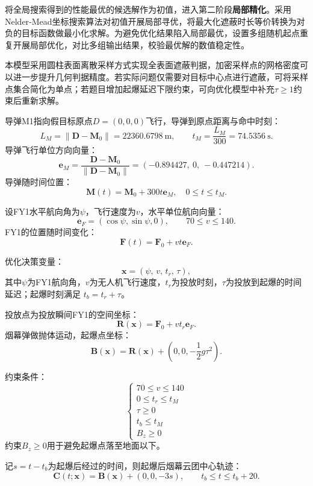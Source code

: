 \documentclass[12pt,a4paper]{article}
\begin{document}
	将全局搜索得到的性能最优的候选解作为初值，进入第二阶段\textbf{局部精化}。采用Nelder‑Mead坐标搜索算法对初值开展局部寻优，将最大化遮蔽时长等价转换为对负的目标函数做最小化求解。为避免优化结果陷入局部最优，设置多组随机起点重复开展局部优化，对比多组输出结果，校验最优解的数值稳定性。
	

	
	本模型采用圆柱表面离散采样方式实现全表面遮蔽判据，加密采样点的网格密度可以进一步提升几何判据精度。若实际问题仅需要对目标中心点进行遮蔽，可将采样点集合简化为单点；若题目增加起爆延迟下限约束，可向优化模型中补充$\tau\ge1$约束后重新求解。


	
	
	导弹M1指向假目标原点$D=(0,0,0)$飞行，导弹到原点距离与命中时刻：
	\[
	L_M=\|\boldsymbol D-\boldsymbol M_0\|=22360.6798\ \mathrm{m},\qquad t_M=\frac{L_M}{300}=74.5356\ \mathrm{s}.
	\]
	导弹飞行单位方向向量：
	\[
	\boldsymbol e_M=\frac{\boldsymbol D-\boldsymbol M_0}{\|\boldsymbol D-\boldsymbol M_0\|}=(-0.894427,\ 0,\ -0.447214).
	\]
	导弹随时间位置：
	\[
	\boldsymbol M(t)=\boldsymbol M_0+300t\boldsymbol e_M,\quad 0\le t\le t_M.
	\]
	
	设FY1水平航向角为$\psi$，飞行速度为$v$，水平单位航向向量：
	\[
	\boldsymbol e_F=(\cos\psi,\sin\psi,0), \qquad 70 \le v \le 140.
	\]
	FY1的位置随时间变化：
	\[
	\boldsymbol F(t)=\boldsymbol F_0+vt\boldsymbol e_F.
	\]
	
	
	优化决策变量：
	\[
	\boldsymbol x=(\psi,\,v,\,t_r,\,\tau),
	\]
	其中$\psi$为FY1航向角，$v$为无人机飞行速度，$t_r$为投放时刻，$\tau$为投放到起爆的时间延迟；起爆时刻满足 $t_b = t_r+\tau$。
	
	投放点为投放瞬间FY1的空间坐标：
	\[
	\boldsymbol R(\boldsymbol x)=\boldsymbol F_0+v t_r \boldsymbol e_F.
	\]
	烟幕弹做抛体运动，起爆点坐标：
	\[
	\boldsymbol B(\boldsymbol x)=\boldsymbol R(\boldsymbol x)+\left(0,0,-\frac12 g\tau^2\right).
	\]
	
	约束条件：
	\[
	\begin{cases}
		70 \le v \le 140\\
		0 \le t_r \le t_M\\
		\tau \ge 0\\
		t_b \le t_M\\
		B_z \ge 0
	\end{cases}
	\]
	约束$B_z\ge0$用于避免起爆点落至地面以下。
	
	记$s=t-t_b$为起爆后经过的时间，则起爆后烟幕云团中心轨迹：
	\[
	\boldsymbol C(t;\boldsymbol x)=\boldsymbol B(\boldsymbol x)+(0,0,-3s),\qquad t_b\le t \le t_b+20.
	\]
	
\end{document}
